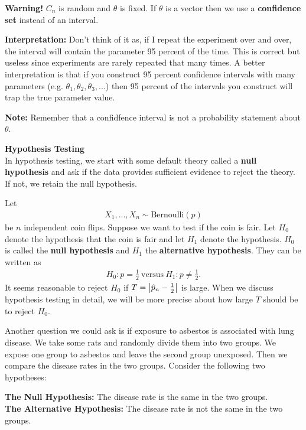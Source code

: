\textbf{Warning!} $C_n$ is random and $\theta$ is fixed. If $\theta$ is a vector then we use a \textbf{confidence set} instead of an interval.

\textbf{Interpretation:} Don't think of it as, if I repeat the experiment over and over, the interval will contain the parameter 95 percent of the time. This is correct but useless since experiments are rarely repeated that many times. A better interpretation is that if you construct 95 percent confidence intervals with many parameters (e.g. $\theta_1,\theta_2,\theta_3,...$) then 95 percent of the intervals you construct will trap the true parameter value.

\textbf{Note:} Remember that a confidfence interval is not a probability statement about $\theta$.

\textbf{Hypothesis Testing} \\
In hypothesis testing, we start with some default theory called a \textbf{null hypothesis} and ask if the data provides sufficient evidence to reject the theory. If not, we retain the null hypothesis.

\begin{exmp}
    Let 
    \begin{align*}
        X_1,...,X_n \sim \mathrm{Bernoulli}(p)
    \end{align*}
    be $n$ independent coin flips. Suppose we want to test if the coin is fair. Let $H_0$ denote the hypothesis that the coin is fair and let $H_1$ denote the hypothesis. $H_0$ is called the \textbf{null hypothesis} and $H_1$ the \textbf{alternative hypothesis}. They can be written as
    \begin{align*}
        H_0:p = \frac{1}{2}\ \mathrm{versus}\ H_1:p \neq \frac{1}{2}.
    \end{align*}
    It seems reasonable to reject $H_0$ if $T = \left| \hat{p}_n - \frac{1}{2} \right|$ is large. When we discuss hypothesis testing in detail, we will be more precise about how large $T$ should be to reject $H_0$.
\end{exmp}
Another question we could ask is if exposure to asbestos is associated with lung disease. We take some rats and randomly divide them into two groups. We expose one group to asbestos and leave the second group unexposed. Then we compare the disease rates in the two groups. Consider the following two hypotheses:

\textbf{The Null Hypothesis:} The disease rate is the same in the two groups. \\
\textbf{The Alternative Hypothesis:} The disease rate is not the same in the two groups.

